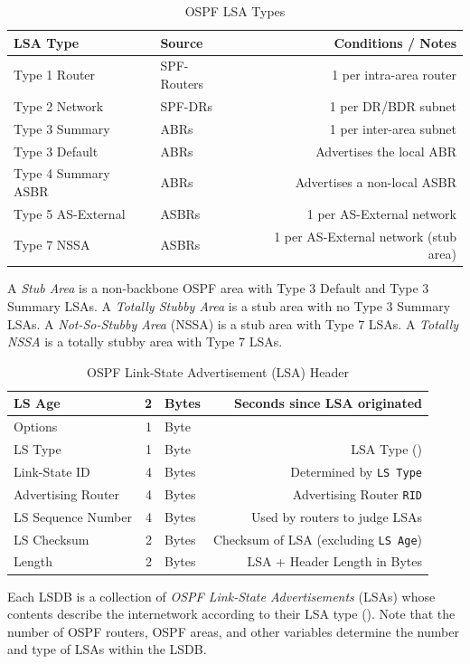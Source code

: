 \documentclass[12pt]{article}
\begin{document}
	\begin{table}[H]
	\centering
	\caption{OSPF LSA Types \label{tab:OSPF LSA TYPES}}
	\begin{tabular}{@{} l l r @{}}\hline
	\textbf{LSA Type}		& \textbf{Source}		& \textbf{Conditions / Notes}\\\hline
	Type 1 Router		& SPF-Routers		& 1 per intra-area router\\
	Type 2 Network		& SPF-DRs			& 1 per DR/BDR subnet\\
	Type 3 Summary		& ABRs			& 1 per inter-area subnet\\
	Type 3 Default		& ABRs			& Advertises the local ABR\\
	Type 4 Summary ASBR	& ABRs			& Advertises a non-local ASBR\\
	Type 5 AS-External	& ASBRs			& 1 per AS-External network\\
	Type 7 NSSA		& ASBRs			& 1 per AS-External network (stub area)\\\hline
	\end{tabular}\end{table}
	
	A \textit{Stub Area} is a non-backbone OSPF area with Type 3 Default and Type 3 Summary LSAs. A \textit{Totally Stubby Area} is a stub area with no Type 3 Summary LSAs. A \textit{Not-So-Stubby Area} (NSSA) is a stub area with Type 7 LSAs. A \textit{Totally NSSA} is a totally stubby area with Type 7 LSAs.

	\begin{table}[H]
	\centering
	\caption{OSPF Link-State Advertisement (LSA) Header \label{tab:OSPF LSA}}
	\begin{tabular}{| l | r @{ } l | r |}\hline
	LS Age			& 2	& Bytes	& Seconds since LSA originated\\\hline
	Options			& 1	& Byte	&\\\hline
	LS Type			& 1	& Byte	& LSA Type (\Cref{tab:OSPF LSA TYPES})\\\hline
	Link-State ID		& 4	& Bytes	& Determined by \texttt{LS Type}\\\hline
	Advertising Router	& 4	& Bytes	& Advertising Router \texttt{RID}\\\hline
	LS Sequence Number	& 4	& Bytes	& Used by routers to judge LSAs\\\hline
	LS Checksum		& 2	& Bytes	& Checksum of LSA (excluding \texttt{LS Age})\\\hline
	Length			& 2	& Bytes	& LSA + Header Length in Bytes\\\hline
	\end{tabular}\end{table}
	Each LSDB is a collection of \textit{OSPF Link-State Advertisements} (LSAs) whose contents describe the internetwork according to their LSA type (). Note that the number of OSPF routers, OSPF areas, and other variables determine the number and type of LSAs within the LSDB.
\end{document}
